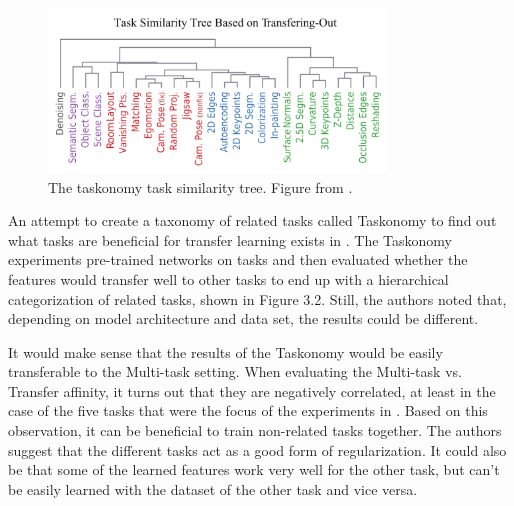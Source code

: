\begin{figure}[h!]
    \centering
    \includegraphics[width=0.8\textwidth]{imgs/taskonomy.png}
    \caption{The taskonomy task similarity tree. Figure from \citep{taskonomy}.\label{fig:params}}
\end{figure}

An attempt to create a taxonomy of related tasks called Taskonomy to find out what tasks are beneficial for transfer learning exists in \citep{taskonomy}.
The Taskonomy experiments pre-trained networks on tasks and then evaluated whether the features would transfer well to other tasks to end up with a hierarchical categorization of related tasks, shown in Figure 3.2.
Still, the authors noted that, depending on model architecture and data set, the results could be different.

It would make sense that the results of the Taskonomy would be easily transferable to the Multi-task setting.
When evaluating the Multi-task vs. Transfer affinity, it turns out that they are negatively correlated, at least in the case of the five tasks that were the focus of the experiments in \citep{whichTasks}.
Based on this observation, it can be beneficial to train non-related tasks together.
The authors suggest that the different tasks act as a good form of regularization.
It could also be that some of the learned features work very well for the other task, but can't be easily learned with the dataset of the other task and vice versa.